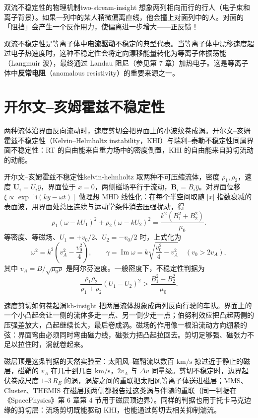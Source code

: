 \documentclass[12pt,a4paper,openany,oneside]{book}
\newcommand{\diffmarktext}[1]{%
  \textcolor{coverMid!80}{\rule[-0.1em]{2pt}{0.9em}}\,%
  \textcolor{coverMid}{\footnotesize\textbf{[#1]}}%
}
\newcommand{\difficulty}[1]{\marginnote{\raggedright\diffmarktext{#1}}}
\newcommand{\ii}{\mathrm{i}}
\newcommand{\vect}[1]{\bm{#1}}
\begin{document}
\begin{insight}{双流不稳定性的物理机制}{two-stream-insight}
想象两列相向而行的行人（电子束和离子背景）。如果一列中的某人稍微偏离直线，他会撞上对面列中的人。对面的「阻挡」会产生一个反作用力，使偏离进一步增大——正反馈！

双流不稳定性是等离子体中\textbf{电流驱动}不稳定的典型代表。当等离子体中漂移速度超过电子热速度时，这种不稳定性会将定向漂移能量转化为等离子体振荡能（Langmuir 波），最终通过 Landau 阻尼（参见第 7 章）加热电子。这是等离子体中\textbf{反常电阻}（anomalous resistivity）的重要来源之一。
\end{insight}

\section{开尔文--亥姆霍兹不稳定性}\difficulty{提高}
\label{sec:ch9-kh}

两种流体沿界面反向流动时，速度剪切会把界面上的小波纹卷成涡。开尔文--亥姆霍兹不稳定性（Kelvin--Helmholtz instability，KHI）与瑞利--泰勒不稳定性同属界面不稳定性：RT 的自由能来自重力场中的密度倒置，KHI 的自由能来自剪切流动的动能。

\begin{theorem}{开尔文--亥姆霍兹不稳定性}{kelvin-helmholtz}
取两种不可压缩流体，密度 $\rho_1,\rho_2$，速度 $\vect{U}_i=U_i\hat y$，界面位于 $x=0$，两侧磁场平行于流动，$\vect{B}_i=B_i\hat y$。对界面位移 $\xi\propto\exp[\ii(ky-\omega t)]$ 做理想 MHD 线性化：在每个半空间取随 $|x|$ 指数衰减的表面波，用界面处总压连续与运动学条件消去压强扰动，得
\[
\rho_1(\omega-kU_1)^2+\rho_2(\omega-kU_2)^2=\frac{k^2(B_1^2+B_2^2)}{\mu_0}.
\label{eq:kh-dispersion}
\]
等密度、等磁场、$U_1=+v_0/2$、$U_2=-v_0/2$ 时，上式化为
\[
\omega^2=k^2\left(v_A^2-\frac{v_0^2}{4}\right),\qquad
\gamma=\operatorname{Im}\omega=k\sqrt{\frac{v_0^2}{4}-v_A^2}\quad(v_0>2v_A),
\label{eq:kh-growth}
\]
其中 $v_A=B/\sqrt{\mu_0\rho}$ 是阿尔芬速度。一般密度下，不稳定性判据为
\[
\frac{\rho_1\rho_2}{\rho_1+\rho_2}(U_1-U_2)^2>\frac{B_1^2+B_2^2}{\mu_0}.
\label{eq:kh-criterion}
\]
\end{theorem}

\begin{insight}{速度剪切如何卷起涡}{kh-insight}
把两层流体想象成两列反向行驶的车队。界面上的一个小凸起会让一侧的流体多走一点、另一侧少走一点；伯努利效应把凸起两侧的压强差放大，凸起继续长大，最后卷成涡。磁场的作用像一根沿流动方向绷紧的弦：界面弯曲必须同时弯曲磁力线，磁张力把凸起拉回去。剪切足够强、磁张力不足以拉住时，涡就卷起来。

磁层顶是这条判据的天然实验室：太阳风--磁鞘流以数百 $\mathrm{km/s}$ 掠过近于静止的磁层，磁鞘的 $v_A$ 在几十到几百 $\mathrm{km/s}$，$2v_A$ 与 $\Delta v$ 同量级。剪切不稳定时，边界起伏卷成尺度 $1$--$3\,R_E$ 的涡，涡旋之间的重联把太阳风等离子体送进磁层；MMS、Cluster、THEMIS 在磁层顶两侧都报告过这类涡与伴随的重联（同一判据在《SpacePhysics》第 6 章第 4 节用于磁层顶边界）。同样的判据也用于托卡马克边缘的剪切层：流场剪切既能驱动 KHI，也能通过剪切去相关抑制湍流。
\end{insight}
\end{document}
